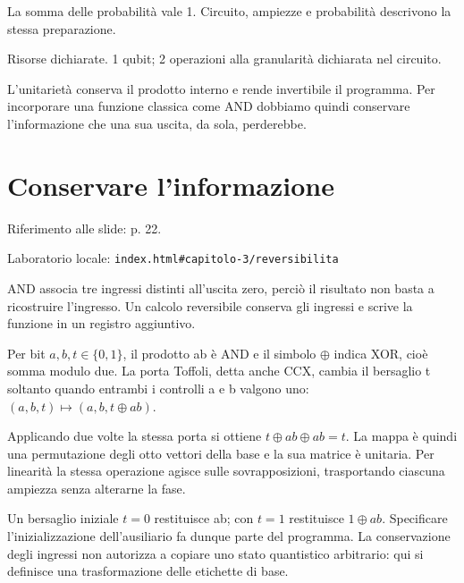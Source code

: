 
La somma delle probabilità vale 1. Circuito, ampiezze e probabilità descrivono la stessa preparazione.\par


Risorse dichiarate. 1 qubit; 2 operazioni alla granularità dichiarata nel circuito.\par


L'unitarietà conserva il prodotto interno e rende invertibile il programma. Per incorporare una funzione classica come AND dobbiamo quindi conservare l'informazione che una sua uscita, da sola, perderebbe.\par



\Needspace{.43\textheight}
\section{Conservare l'informazione}
\label{c3-reversibilita}

{\sffamily\small\color{Ink!70} Riferimento alle slide: p. 22.\par}

{\sffamily\small\color{Ink!70} Laboratorio locale: \nolinkurl{index.html#capitolo-3/reversibilita}\par}

AND associa tre ingressi distinti all'uscita zero, perciò il risultato non basta a ricostruire l'ingresso. Un calcolo reversibile conserva gli ingressi e scrive la funzione in un registro aggiuntivo.\par

Per bit \(a,\allowbreak b,\allowbreak t\in \{0{,}1\}\), il prodotto ab è AND e il simbolo \(\oplus \) indica XOR, cioè somma modulo due. La porta Toffoli, detta anche CCX, cambia il bersaglio t soltanto quando entrambi i controlli a e b valgono uno: \((a,\allowbreak b,\allowbreak t)\mapsto (a,\allowbreak b,\allowbreak t\oplus ab)\).\par

Applicando due volte la stessa porta si ottiene \(t\oplus ab\oplus ab=t\). La mappa è quindi una permutazione degli otto vettori della base e la sua matrice è unitaria. Per linearità la stessa operazione agisce sulle sovrapposizioni, trasportando ciascuna ampiezza senza alterarne la fase.\par

Un bersaglio iniziale \(t=0\) restituisce ab; con \(t=1\) restituisce \(1\oplus ab\). Specificare l'inizializzazione dell'ausiliario fa dunque parte del programma. La conservazione degli ingressi non autorizza a copiare uno stato quantistico arbitrario: qui si definisce una trasformazione delle etichette di base.\par


